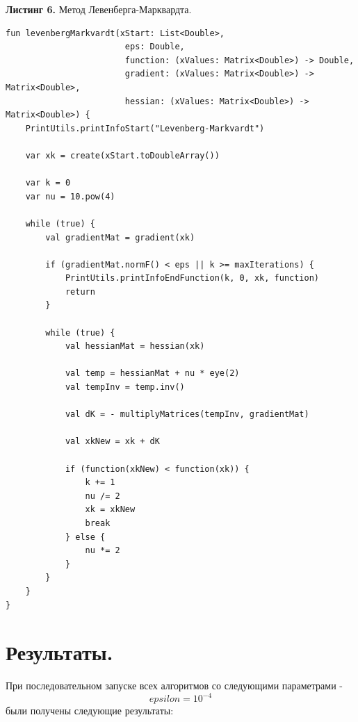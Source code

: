\documentclass[a4paper, 12pt]{article}   	%
\begin{document}
\textbf{Листинг 6.} Метод Левенберга-Марквардта.
    \begin{verbatim}
fun levenbergMarkvardt(xStart: List<Double>,
                        eps: Double,
                        function: (xValues: Matrix<Double>) -> Double,
                        gradient: (xValues: Matrix<Double>) -> Matrix<Double>,
                        hessian: (xValues: Matrix<Double>) -> Matrix<Double>) {
    PrintUtils.printInfoStart("Levenberg-Markvardt")
    
    var xk = create(xStart.toDoubleArray())
    
    var k = 0
    var nu = 10.pow(4)
    
    while (true) {
        val gradientMat = gradient(xk)
    
        if (gradientMat.normF() < eps || k >= maxIterations) {
            PrintUtils.printInfoEndFunction(k, 0, xk, function)
            return
        }
    
        while (true) {
            val hessianMat = hessian(xk)
    
            val temp = hessianMat + nu * eye(2)
            val tempInv = temp.inv()
    
            val dK = - multiplyMatrices(tempInv, gradientMat)
    
            val xkNew = xk + dK
    
            if (function(xkNew) < function(xk)) {
                k += 1
                nu /= 2
                xk = xkNew
                break
            } else {
                nu *= 2
            }
        }
    }
}
\end{verbatim}

    
\newpage

\section{Результаты.}
    При последовательном запуске всех алгоритмов со следующими параметрами -
    \begin{equation}
        epsilon = 10^{-4}
    \end{equation}
    были получены следующие результаты:
    
\end{document}
